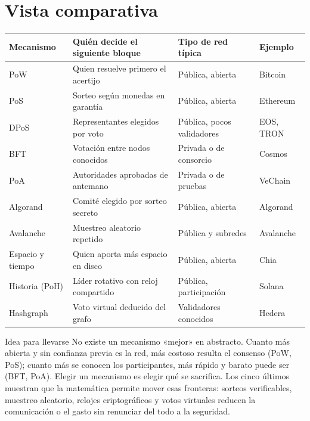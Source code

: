 \documentclass[11pt,a4paper]{article}
\theoremstyle{definition}
\theoremstyle{plain}
\theoremstyle{remark}
\begin{document}
\section{Vista comparativa}\label{sec:comparativa}

\begin{center}
\small
\begin{tabularx}{\textwidth}{@{}lXll@{}}
\toprule
Mecanismo & Quién decide el siguiente bloque & Tipo de red típica & Ejemplo \\
\midrule
PoW   & Quien resuelve primero el acertijo        & Pública, abierta & Bitcoin \\
PoS   & Sorteo según monedas en garantía          & Pública, abierta & Ethereum \\
DPoS  & Representantes elegidos por voto          & Pública, pocos validadores & EOS, TRON \\
BFT   & Votación entre nodos conocidos            & Privada o de consorcio & Cosmos \\
PoA   & Autoridades aprobadas de antemano         & Privada o de pruebas & VeChain \\
\midrule
Algorand   & Comité elegido por sorteo secreto    & Pública, abierta & Algorand \\
Avalanche  & Muestreo aleatorio repetido          & Pública y subredes & Avalanche \\
Espacio y tiempo & Quien aporta más espacio en disco & Pública, abierta & Chia \\
Historia (PoH)   & Líder rotativo con reloj compartido & Pública, participación & Solana \\
Hashgraph  & Voto virtual deducido del grafo      & Validadores conocidos & Hedera \\
\bottomrule
\end{tabularx}
\end{center}

\begin{clave}{Idea para llevarse}
No existe un mecanismo «mejor» en abstracto. Cuanto más abierta y sin confianza
previa es la red, más costoso resulta el consenso (PoW, PoS); cuanto más se
conocen los participantes, más rápido y barato puede ser (BFT, PoA). Elegir un
mecanismo es elegir qué se sacrifica. Los cinco últimos muestran que la matemática
permite mover esas fronteras: sorteos verificables, muestreo aleatorio, relojes
criptográficos y votos virtuales reducen la comunicación o el gasto sin renunciar
del todo a la seguridad.
\end{clave}
\end{document}
